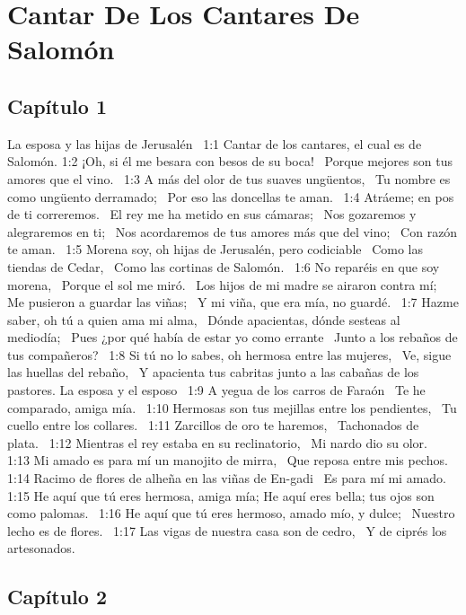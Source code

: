 
\chapter{Cantar De Los Cantares De Salomón}

\section*{Capítulo 1 }
La esposa y las hijas de Jerusalén  
1:1 Cantar de los cantares, el cual es de Salomón. 
1:2 ¡Oh, si él me besara con besos de su boca!  
Porque mejores son tus amores que el vino.  
1:3 A más del olor de tus suaves ungüentos,  
Tu nombre es como ungüento derramado;  
Por eso las doncellas te aman.  
1:4 Atráeme; en pos de ti correremos.  
El rey me ha metido en sus cámaras;  
Nos gozaremos y alegraremos en ti;  
Nos acordaremos de tus amores más que del vino;  
Con razón te aman.  
1:5 Morena soy, oh hijas de Jerusalén, pero codiciable  
Como las tiendas de Cedar,  
Como las cortinas de Salomón.  
1:6 No reparéis en que soy morena,  
Porque el sol me miró.  
Los hijos de mi madre se airaron contra mí;  
Me pusieron a guardar las viñas;  
Y mi viña, que era mía, no guardé.  
1:7 Hazme saber, oh tú a quien ama mi alma,  
Dónde apacientas, dónde sesteas al mediodía;  
Pues ¿por qué había de estar yo como errante  
Junto a los rebaños de tus compañeros?  
1:8 Si tú no lo sabes, oh hermosa entre las mujeres,  
Ve, sigue las huellas del rebaño,  
Y apacienta tus cabritas junto a las cabañas de los pastores. 
La esposa y el esposo  
1:9 A yegua de los carros de Faraón  
Te he comparado, amiga mía.  
1:10 Hermosas son tus mejillas entre los pendientes,  
Tu cuello entre los collares.  
1:11 Zarcillos de oro te haremos,  
Tachonados de plata.  
1:12 Mientras el rey estaba en su reclinatorio,  
Mi nardo dio su olor.  
1:13 Mi amado es para mí un manojito de mirra,  
Que reposa entre mis pechos.  
1:14 Racimo de flores de alheña en las viñas de En-gadi  
Es para mí mi amado.  
1:15 He aquí que tú eres hermosa, amiga mía; 
He aquí eres bella; tus ojos son como palomas.  
1:16 He aquí que tú eres hermoso, amado mío, y dulce;  
Nuestro lecho es de flores.  
1:17 Las vigas de nuestra casa son de cedro,  
Y de ciprés los artesonados.  
\section*{Capítulo 2 }

